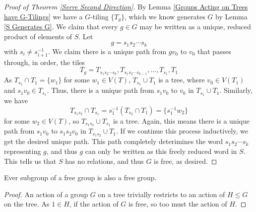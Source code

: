 \begin{proof}[Proof of Theorem \ref{Serre Second Direction}]
    By Lemma \ref{Groups Acting on Trees have G-Tilings} we have a $G$-tiling $\{T_g\}$, which we know generates $G$ by Lemma \ref{S Generates G}. We claim that every $g \in G$ may be written as a unique, reduced product of elements of $S$. Let 
    \[g = s_1s_2 \cdots s_k\]
    with $s_i \neq s_{i+1}^{-1}$. We claim there is a unique path from $gv_0$ to $v_0$ that passes through, in order, the tiles
    \[T_g = T_{s_1s_2\cdots s_k}, T_{s_1s_2\cdots s_{k-1}}, \ldots, T_{s_1}, T_1\]
    As $T_{s_1} \cap T_1 = \{w_1\}$ for some $w_1 \in V(T)$, $T_{s_1} \cup T_1$ is a tree, where $v_0 \in V(T_1)$ and $s_1v_0 \in T_{s_1}$. Thus, there is a unique path from $s_1v_0$ to $v_0$ in $T_{s_1} \cup T_1$. Similarly, we have 
    \[T_{s_1s_2} \cap T_{s_1} = s_1^{-1}(T_{s_2} \cap T_1) = \{s_1^{-1}w_2\}\]
    for some $w_2 \in V(T)$, so $T_{s_1s_2} \cup T_{s_1}$ is a tree. Again, this means there is a unique path from $s_1v_0$ to $s_1s_2v_0$ in $T_{s_1s_2} \cup T_1$. If we continue this process inductively, we get the desired unique path. This path completely deterimines the word $s_1s_2\cdots s_k$ representing $g$, and thus $g$ can only be written as this freely reduced word in $S$. This tells us that $S$ has no relations, and thus $G$ is free, as desired. 
\end{proof}

\begin{cor}
    Ever subgroup of a free group is also a free group. 
\end{cor}

\begin{proof}
    An action of a group $G$ on a tree trivially restricts to an action of $H \leq G$ on the tree. As $1 \in H$, if the action of $G$ is free, so too must the action of $H$. 
\end{proof}